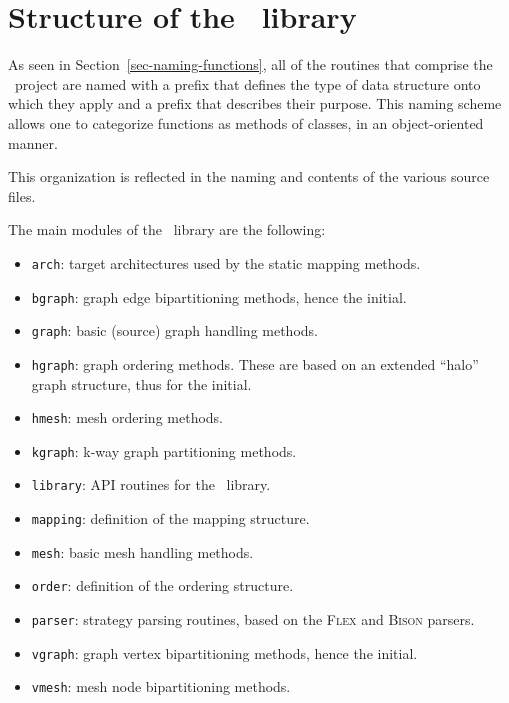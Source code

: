 
\section{Structure of the \libscotch\ library}
\label{sec-structure}

As seen in Section~\ref{sec-naming-functions}, all of the routines
that comprise the \libscotch\ project are named with a prefix that
defines the type of data structure onto which they apply and a prefix
that describes their purpose. This naming scheme allows one to
categorize functions as methods of classes, in an object-oriented
manner.

This organization is reflected in the naming and contents of the
various source files.

The main modules of the \libscotch\ library are the following:
\begin{itemize}
\item
\texttt{arch}: target architectures used by the static mapping methods.
\item
\texttt{bgraph}: graph edge bipartitioning methods, hence the initial.
\item
\texttt{graph}: basic (source) graph handling methods.
\item
\texttt{hgraph}: graph ordering methods. These are based on an extended
``halo'' graph structure, thus for the initial.
\item
\texttt{hmesh}: mesh ordering methods.
\item
\texttt{kgraph}: k-way graph partitioning methods.
\item
\texttt{library}: API routines for the \libscotch\ library.
\item
\texttt{mapping}: definition of the mapping structure.
\item
\texttt{mesh}: basic mesh handling methods.
\item
\texttt{order}: definition of the ordering structure.
\item
\texttt{parser}: strategy parsing routines, based on the \textsc{Flex}
and \textsc{Bison} parsers.
\item
\texttt{vgraph}: graph vertex bipartitioning methods, hence the initial.
\item
\texttt{vmesh}: mesh node bipartitioning methods.
\end{itemize}

